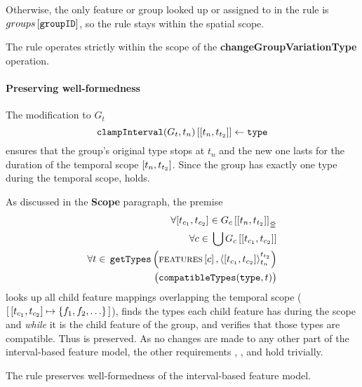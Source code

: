Otherwise, the only feature or group looked up or assigned to in the rule is $groups \left[ \texttt{groupID} \right]$, so the rule stays within the spatial scope.
\\

\begin{lemma}
   The  rule operates strictly within the scope of the \textbf{changeGroupVariationType} operation.
   \label{lemma:change-group-variation-type-scope}
\end{lemma}

\paragraph{Preserving well-formedness}

The modification to $G_t$
\[
   \lookup{\var{clampInterval}(G_t, t_n)}{\interval{t_n}{t_{t_2}}} \assign \var{type}
\]
ensures that the group's original type stops at $t_n$ and the new one lasts for the duration of the temporal scope $\interval{t_n}{t_{t_2}}$. Since the group has exactly one type during the temporal scope,  holds.

As discussed in the \textbf{Scope} paragraph, the premise 
\[
   \begin{split}
        \forall \interval{t_{c_1}}{t_{c_2}} \in \overlapping{G_c}{t_n}{t_{t_2}}\\ %
        \forall c \in \, \bigcup \lookup{G_c}{\interval{t_{c_1}}{t_{c_2}}}\\ %
        \forall t \in \, \var{getTypes}\left(\lookup{\features}{c}, \clamp{\interval{t_{c_1}}{t_{c_2}}}{t_n}{t_{t_2}}\right) \\ %
        \big(\var{compatibleTypes}(\var{type}, t)\big)
   \end{split}
\]
looks up all child feature mappings overlapping the temporal scope ($\intervalmapping{t_{c_1}}{t_{c_2}}{\set{f_1, f_2, \ldots}}$), finds the types each child feature has during the scope and \emph{while} it is the child feature of the group, and verifies that those types are compatible. Thus  is preserved. 
As no changes are made to any other part of the interval-based feature model, the other requirements , , and  hold trivially.
\\

\begin{lemma}
   The  rule preserves well-formedness of the interval-based feature model. 
   \label{lemma:change-group-variation-type-well-formed}
\end{lemma}

